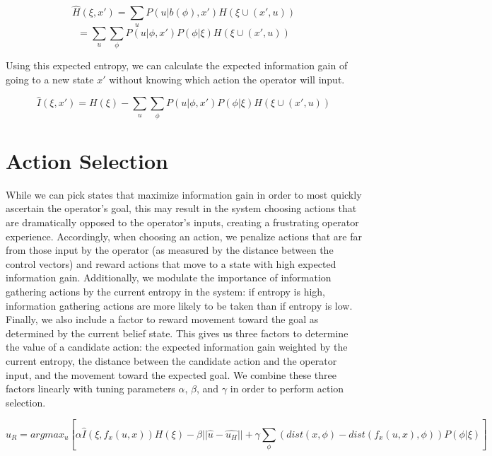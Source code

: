 \documentclass[a4paper]{article}
\begin{document}
\[
\hat{H}(\xi, x') = \sum_u P(u|b(\phi),x')H(\xi \cup (x', u))
\]
\[
= \sum_u \sum_\phi P(u|\phi,x')P(\phi|\xi)H(\xi \cup (x', u))
\]

Using this expected entropy, we can calculate the expected information gain of going to a new state $x'$ without knowing which action the operator will input.

\[
\hat{I}(\xi, x') = H(\xi) - \sum_u \sum_\phi P(u|\phi,x')P(\phi|\xi)H(\xi \cup (x', u))
\]

\section{Action Selection}

While we can pick states that maximize information gain in order to most quickly ascertain the operator's goal, this may result in the system choosing actions that are dramatically opposed to the operator's inputs, creating a frustrating operator experience. Accordingly, when choosing an action, we penalize actions that are far from those input by the operator (as measured by the distance between the control vectors) and reward actions that move to a state with high expected information gain. Additionally, we modulate the importance of information gathering actions by the current entropy in the system: if entropy is high, information gathering actions are more likely to be taken than if entropy is low. Finally, we also include a factor to reward movement toward the goal as determined by the current belief state. This gives us three factors to determine the value of a candidate action: the expected information gain weighted by the current entropy, the distance between the candidate action and the operator input, and the movement toward the expected goal. We combine these three factors linearly with tuning parameters $\alpha$, $\beta$, and $\gamma$ in order to perform action selection.

\[
u_R = argmax_u [\alpha \hat{I}(\xi, f_x(u,x))H(\xi) - \beta ||\hat{u}-\hat{u_H}|| + \gamma \sum_\phi (dist(x, \phi) - dist(f_x(u, x), \phi))P(\phi|\xi)]
\]




\end{document}
